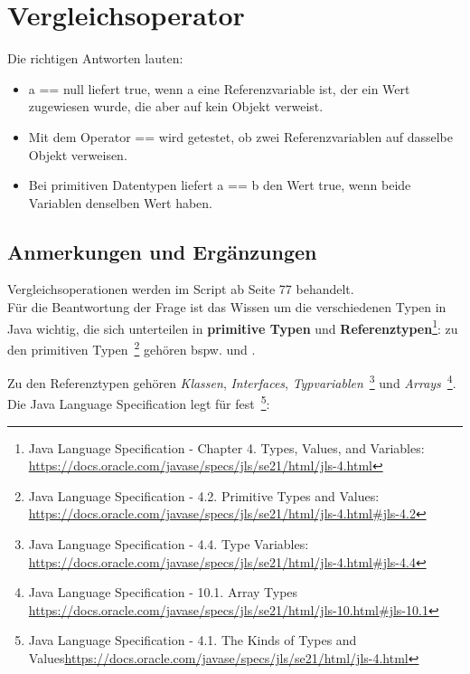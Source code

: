 \chapter{Vergleichsoperator}

Die richtigen Antworten lauten:

\begin{itemize}
    \item a == null liefert true, wenn a eine Referenzvariable ist, der ein Wert zugewiesen wurde, die aber auf kein Objekt verweist.
    \item Mit dem Operator == wird getestet, ob zwei Referenzvariablen auf dasselbe Objekt verweisen.
    \item Bei primitiven Datentypen liefert a == b den Wert true, wenn beide Variablen denselben Wert haben.
\end{itemize}


\section*{Anmerkungen und Ergänzungen}

Vergleichsoperationen werden im Script ab Seite 77 behandelt.\\

Für die Beantwortung der Frage ist das Wissen um die verschiedenen Typen in Java wichtig, die sich unterteilen in
\textbf{primitive Typen} und \textbf{Referenztypen}\footnote{
    Java Language Specification - Chapter 4. Types, Values, and Variables: \url{https://docs.oracle.com/javase/specs/jls/se21/html/jls-4.html}
}: zu den primitiven Typen~\footnote{
    Java Language Specification - 4.2. Primitive Types and Values: \url{https://docs.oracle.com/javase/specs/jls/se21/html/jls-4.html#jls-4.2}
} gehören bspw.  und .

Zu den Referenztypen gehören \textit{Klassen}, \textit{Interfaces}, \textit{Typvariablen}~\footnote{
    Java Language Specification - 4.4. Type Variables: \url{https://docs.oracle.com/javase/specs/jls/se21/html/jls-4.html#jls-4.4}
}
und \textit{Arrays}~\footnote{
    Java Language Specification - 10.1. Array Types \url{https://docs.oracle.com/javase/specs/jls/se21/html/jls-10.html#jls-10.1}
}.\\

Die Java Language Specification legt für  fest~\footnote{Java Language Specification - 4.1. The Kinds of Types and Values\url{https://docs.oracle.com/javase/specs/jls/se21/html/jls-4.html}}:

